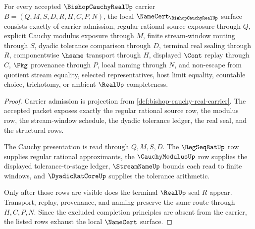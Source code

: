 \begin{theorem}
\label{thm:bishop-cauchy-real-namecert-obligations}
For every accepted $\BishopCauchyRealUp$ carrier $B=(Q,M,S,D,R,H,C,P,N)$, the local $\NameCert_{\BishopCauchyRealUp}$ surface consists exactly of carrier admission, regular rational source exposure through $Q$, explicit Cauchy modulus exposure through $M$, finite stream-window routing through $S$, dyadic tolerance comparison through $D$, terminal real sealing through $R$, componentwise $\hsame$ transport through $H$, displayed $\Cont$ replay through $C$, $\Pkg$ provenance through $P$, local naming through $N$, and non-escape from quotient stream equality, selected representatives, host limit equality, countable choice, trichotomy, or ambient $\RealUp$ completeness.
\end{theorem}
\begin{proof}
Carrier admission is projection from \autoref{def:bishop-cauchy-real-carrier}. The accepted packet exposes exactly the regular rational source row, the modulus row, the stream-window schedule, the dyadic tolerance ledger, the real seal, and the structural rows.

The Cauchy presentation is read through $Q,M,S,D$. The $\RegSeqRatUp$ row supplies regular rational approximants, the $\CauchyModulusUp$ row supplies the displayed tolerance-to-stage ledger, $\StreamNameUp$ bounds each read to finite windows, and $\DyadicRatCoreUp$ supplies the tolerance arithmetic.

Only after those rows are visible does the terminal $\RealUp$ seal $R$ appear. Transport, replay, provenance, and naming preserve the same route through $H,C,P,N$. Since the excluded completion principles are absent from the carrier, the listed rows exhaust the local $\NameCert$ surface.
\end{proof}

